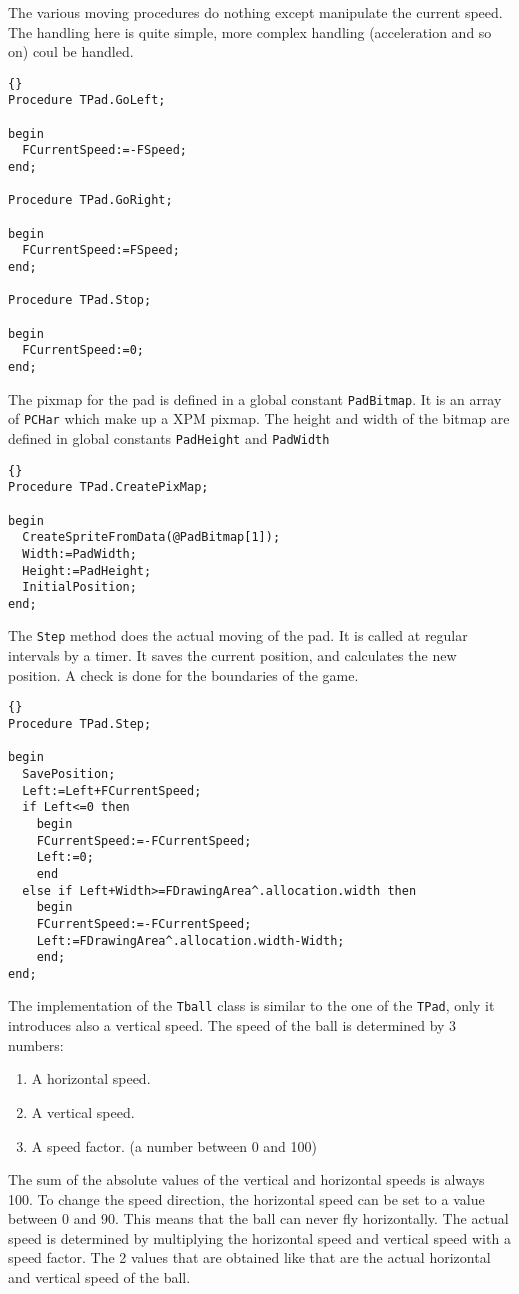 \documentclass[10pt]{article}
\newcommand{\var}[1]{\texttt{#1}}
\begin{document}
The various moving procedures do nothing except manipulate the current speed.
The handling here is quite simple, more complex handling (acceleration and
so on) coul be handled.
\begin{lstlisting}{}
Procedure TPad.GoLeft;

begin
  FCurrentSpeed:=-FSpeed;
end;

Procedure TPad.GoRight;

begin
  FCurrentSpeed:=FSpeed;
end;

Procedure TPad.Stop;

begin
  FCurrentSpeed:=0;
end;
\end{lstlisting}{}
The pixmap for the pad is defined in a global constant \var{PadBitmap}. It is 
an array of \var{PCHar} which make up a XPM pixmap. The height and width of 
the bitmap are defined in global constants \var{PadHeight} and \var{PadWidth}
\begin{lstlisting}{}
Procedure TPad.CreatePixMap; 

begin
  CreateSpriteFromData(@PadBitmap[1]);
  Width:=PadWidth;
  Height:=PadHeight;
  InitialPosition;
end;
\end{lstlisting}{}
The \var{Step} method does the actual moving of the pad. It is called at regular intervals
by a timer. It saves the current position, and calculates the new position. A check is 
done for the boundaries of the game.
\begin{lstlisting}{}
Procedure TPad.Step;

begin
  SavePosition;
  Left:=Left+FCurrentSpeed;
  if Left<=0 then
    begin
    FCurrentSpeed:=-FCurrentSpeed;
    Left:=0;
    end
  else if Left+Width>=FDrawingArea^.allocation.width then
    begin
    FCurrentSpeed:=-FCurrentSpeed;
    Left:=FDrawingArea^.allocation.width-Width;
    end;
end;
\end{lstlisting}{}

The implementation of the \var{Tball} class is similar to the one of the \var{TPad},
only it introduces also a vertical speed. The speed of the ball is determined by 3 
numbers:
\begin{enumerate}
\item A horizontal speed.
\item A vertical speed. 
\item A speed factor. (a number between 0 and 100)
\end{enumerate} 
The sum of the absolute values of the vertical and horizontal speeds is always 100. 
To change the speed direction, the horizontal speed can be set to a value between 0
and 90. This means that the ball can never fly horizontally. The actual speed is 
determined by multiplying the horizontal speed and vertical speed with a speed 
factor. The 2 values that are obtained like that are the actual horizontal and 
vertical speed of the ball.
\end{document}
